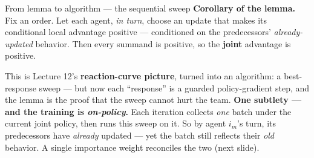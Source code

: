 \documentclass[10pt, aspectratio=169]{beamer}
\begin{document}
\begin{frame}{From lemma to algorithm --- the sequential sweep}
\textbf{Corollary of the lemma.} Fix an order. Let each agent, \emph{in turn}, choose an update that makes its \alert{conditional} local advantage positive --- conditioned on the predecessors' \emph{already-updated} behavior. Then every summand is positive, so the \textbf{joint} advantage is positive.
\medskip

\begin{center}
\end{center}
\medskip

\pause
This is Lecture 12's \textbf{reaction-curve picture}, turned into an algorithm: a best-response sweep --- but now each ``response'' is a guarded policy-gradient step, and the lemma is the proof that the sweep cannot hurt the team.
\medskip
\pause
\textbf{One subtlety --- and the training is \emph{on-policy}.} Each iteration collects \emph{one} batch under the current joint policy, then runs this sweep on it. So by agent $i_m$'s turn, its predecessors have \emph{already} updated --- yet the batch still reflects their \emph{old} behavior. A single importance weight reconciles the two (next slide).
\end{frame}
\end{document}
